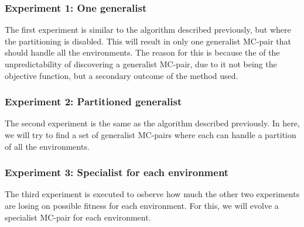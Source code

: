         \subsubsection{Experiment 1: One generalist}
            The first experiment is similar to the algorithm described previously, but where the partitioning is disabled. This will result in only one generalist MC-pair that should handle all the environments. The reason for this is because the of the unpredictability of discovering a generalist MC-pair, due to it not being the objective function, but a secondary outcome of the method used.
        \subsubsection{Experiment 2: Partitioned generalist}
            The second experiment is the same as the algorithm described previously. In here, we will try to find a set of generalist MC-pairs where each can handle a partition of all the environments. 
        \subsubsection{Experiment 3: Specialist for each environment}
            The third experiment is executed to osberve how much the other two experiments are losing on possible fitness for each environment. For this, we will evolve a specialist MC-pair for each environment.